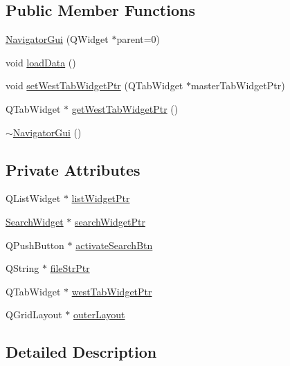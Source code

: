 \subsection*{Public Member Functions}
\begin{DoxyCompactItemize}
\item 
\hyperlink{class_navigator_gui_ac7a57ace6bc543313233afffe9a9073b}{Navigator\-Gui} (Q\-Widget $\ast$parent=0)
\item 
void \hyperlink{class_navigator_gui_a318115279c155077854f5126d290b2b7}{load\-Data} ()
\item 
void \hyperlink{class_navigator_gui_a3d5d2c50735ed741cad32790b6ed8778}{set\-West\-Tab\-Widget\-Ptr} (Q\-Tab\-Widget $\ast$master\-Tab\-Widget\-Ptr)
\item 
Q\-Tab\-Widget $\ast$ \hyperlink{class_navigator_gui_a3eeb5652b2351ecb1988c17ee857c9cf}{get\-West\-Tab\-Widget\-Ptr} ()
\item 
\hyperlink{class_navigator_gui_a8fc032fe6ad4c935a14ba22853191285}{$\sim$\-Navigator\-Gui} ()
\end{DoxyCompactItemize}
\subsection*{Private Attributes}
\begin{DoxyCompactItemize}
\item 
Q\-List\-Widget $\ast$ \hyperlink{class_navigator_gui_aa3732fbecbd29c6a22eaebe82bb57af7}{list\-Widget\-Ptr}
\item 
\hyperlink{class_search_widget}{Search\-Widget} $\ast$ \hyperlink{class_navigator_gui_a33531deedb97ceb340409fc4e5f8620e}{search\-Widget\-Ptr}
\item 
Q\-Push\-Button $\ast$ \hyperlink{class_navigator_gui_a8256fec3fdcad7fea838c7ba701e3d6e}{activate\-Search\-Btn}
\item 
Q\-String $\ast$ \hyperlink{class_navigator_gui_aa233c8e6f7634b4de98b2dcaaa86ed69}{file\-Str\-Ptr}
\item 
Q\-Tab\-Widget $\ast$ \hyperlink{class_navigator_gui_aea3dc7b54a723ca369742ee6a0f34f03}{west\-Tab\-Widget\-Ptr}
\item 
Q\-Grid\-Layout $\ast$ \hyperlink{class_navigator_gui_a0e981a409e2879e799f5e05e0c695f4a}{outer\-Layout}
\end{DoxyCompactItemize}


\subsection{Detailed Description}


